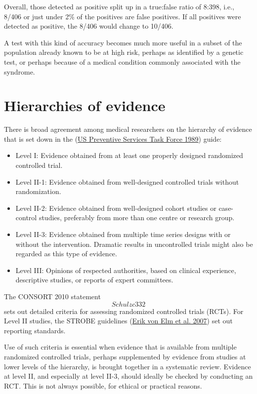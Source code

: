 \documentclass[
  10pt,
  b5paper]{book}
\providecommand{\tightlist}{%
  \setlength{\itemsep}{0pt}\setlength{\parskip}{0pt}}
\begin{document}
Overall, those detected as positive split up in a true:false ratio of
8:398, i.e., 8/406 or just under 2\% of the positives are false
positives. If all positives were detected as positive, the 8/406 would
change to 10/406.

A test with this kind of accuracy becomes much more useful in a subset
of the population already known to be at high risk, perhaps as
identified by a genetic test, or perhaps because of a medical condition
commonly associated with the syndrome.

\hypertarget{hierarchies-of-evidence}{%
\section{Hierarchies of evidence}\label{hierarchies-of-evidence}}

There is broad agreement among medical researchers on the hierarchy of
evidence that is set down in the (\protect\hyperlink{ref-us1989guide}{US Preventive Services Task Force 1989}) guide:

\begin{itemize}
\tightlist
\item
  Level I: Evidence obtained from at least one properly designed
  randomized controlled trial.
\item
  Level II-1: Evidence obtained from well-designed controlled trials
  without randomization.
\item
  Level II-2: Evidence obtained from well-designed cohort studies or
  case-control studies, preferably from more than one centre or
  research group.
\item
  Level II-3: Evidence obtained from multiple time series designs with
  or without the intervention. Dramatic results in uncontrolled trials
  might also be regarded as this type of evidence.
\item
  Level III: Opinions of respected authorities, based on clinical
  experience, descriptive studies, or reports of expert committees.
\end{itemize}

The CONSORT 2010 statement \[Schulzc332\] sets out detailed criteria for
assessing randomized controlled trials (RCTs). For Level II studies, the
STROBE guidelines (\protect\hyperlink{ref-erik2007strengthening}{Erik von Elm et al. 2007}) set out reporting standards.

Use of such criteria is essential when evidence that is available from
multiple randomized controlled trials, perhaps supplemented by evidence
from studies at lower levels of the hierarchy, is brought together in a
systematic review. Evidence at level II, and especially at level II-3,
should ideally be checked by conducting an RCT. This is not always
possible, for ethical or practical reasons.
\end{document}
